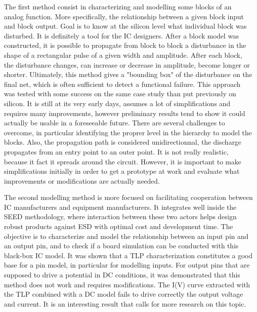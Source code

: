 The first method consist in characterizing and modelling some blocks of an analog function.
More specifically, the relationship between a given block input and block output.
Goal is to know at the silicon level what individual block was disturbed.
It is definitely a tool for the IC designers.
After a block model was constructed, it is possible to propagate from block to block a disturbance in the shape of a rectangular pulse of a given width and amplitude.
After each block, the disturbance changes, can increase or decrease in amplitude, become longer or shorter.
Ultimately, this method gives a "bounding box" of the disturbance on the final net, which is often sufficient to detect a functional failure.
This approach was tested with some success on the same case study than put previously on silicon.
It is still at its very early days, assumes a lot of simplifications and requires many improvements, however preliminary results tend to show it could actually be usable in a foreseeable future.
There are several challenges to overcome, in particular identifying the proprer level in the hierarchy to model the blocks.
Also, the propagation path is considered unidirectionnal, the discharge propagates from an entry point to an outer point.
It is not really realistic, because it fact it spreads around the circuit.
However, it is important to make simplifications initially in order to get a prototype at work and evaluate what improvements or modifications are actually needed.

The second modelling method is more focused on facilitating cooperation between IC manufacturers and equipment manufacturers.
It integrates well inside the SEED methodology, where interaction between these two actors helps design robust products against ESD with optimal cost and development time.
The objective is to characterize and model the relationship between an input pin and an output pin, and to check if a board simulation can be conducted with this black-box IC model.
It was shown that a TLP characterization constitutes a good base for a pin model, in particular for modelling inputs.
For output pins that are supposed to drive a potential in DC conditions, it was demonstrated that this method does not work and requires modifications.
The I(V) curve extracted with the TLP combined with a DC model fails to drive correctly the output voltage and current.
It is an interesting result that calls for more research on this topic.

